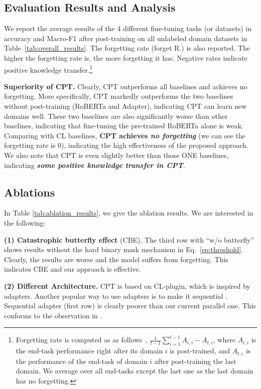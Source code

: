 \documentclass[11pt]{article}
\begin{document}
\subsection{Evaluation Results and Analysis}
\label{sec:results}
We report the average results of the 4 different fine-tuning tasks (or datasets) in accuracy and Macro-F1 after post-training on all unlabeled domain datasets in
Table~\ref{tab:overall_results}. The forgetting rate (forget R.) \cite{DBLP:conf/cvpr/LiuSLSS20} is also reported. The higher the forgetting rate is, the more forgetting it has. Negative rates indicate positive knowledge transfer.\footnote{Forgetting rate is {\color{black}computed as as follows~\cite{DBLP:conf/cvpr/LiuSLSS20},} $\frac{1}{t-1}\sum_{i=1}^{t-1}A_{i,i} - A_{t,i}$, where $A_{i,i}$ is the end-task performance right after its domain $i$ is post-trained, and $A_{t,i}$ is the performance of the end-task of domain $i$ after post-training the last domain. We average over all end-tasks except the last one as the last domain has no forgetting.}


\textbf{Superiority of CPT.} Clearly, CPT outperforms all baselines and achieves no forgetting. More specifically, CPT markedly outperforms the two baselines without post-training (RoBERTa and Adapter), indicating CPT can learn new domains well. These two baselines are also  significantly worse than other baselines, indicating that fine-tuning the pre-trained RoBERTa alone is weak. 
Comparing with CL baselines, \textbf{CPT achieves \textit{no forgetting}} (we can see the forgetting rate is 0), indicating the high effectiveness of the proposed approach. We also note that CPT is even slightly better than those ONE baselines, indicating \textbf{\textit{some positive knowledge transfer in CPT}}. 


\subsection{Ablations} 
In Table \ref{tab:ablation_results}, we give the ablation results. We are interested in the following:

\textbf{(1) Catastrophic butterfly effect} (CBE). The third row with ``w/o butterfly'' shows results without the hard binary mask mechanism in Eq.~\ref{eq:threshold}. Clearly, the results are worse and the model suffers from forgetting. This indicates CBE and our approach is effective. 

\textbf{(2) Different Architecture.} CPT is based on CL-plugin, which is inspired by adapters. Another popular way to use adapters is to make it sequential \cite{Houlsby2019Parameter}. Sequential adapter (first row) is clearly poorer than our current parallel one. This conforms to the observation in \cite{DBLP:journals/corr/abs-2110-04366}. 
\end{document}
